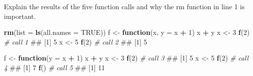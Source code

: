 \documentclass[12,]{article}
\newenvironment{Shaded}{\begin{snugshade}}{\end{snugshade}}
\newcommand{\KeywordTok}[1]{\textcolor[rgb]{0.13,0.29,0.53}{\textbf{#1}}}
\newcommand{\DataTypeTok}[1]{\textcolor[rgb]{0.13,0.29,0.53}{#1}}
\newcommand{\DecValTok}[1]{\textcolor[rgb]{0.00,0.00,0.81}{#1}}
\newcommand{\StringTok}[1]{\textcolor[rgb]{0.31,0.60,0.02}{#1}}
\newcommand{\CommentTok}[1]{\textcolor[rgb]{0.56,0.35,0.01}{\textit{#1}}}
\newcommand{\OtherTok}[1]{\textcolor[rgb]{0.56,0.35,0.01}{#1}}
\newcommand{\ControlFlowTok}[1]{\textcolor[rgb]{0.13,0.29,0.53}{\textbf{#1}}}
\newcommand{\OperatorTok}[1]{\textcolor[rgb]{0.81,0.36,0.00}{\textbf{#1}}}
\newcommand{\NormalTok}[1]{#1}
\begin{document}
Explain the results of the five function calls and why the rm function
in line 1 is important.

\begin{Shaded}
\begin{Highlighting}[]
\KeywordTok{rm}\NormalTok{(}\DataTypeTok{list =} \KeywordTok{ls}\NormalTok{(}\DataTypeTok{all.names =} \OtherTok{TRUE}\NormalTok{))}
\NormalTok{f <-}\StringTok{ }\ControlFlowTok{function}\NormalTok{(x, }\DataTypeTok{y =}\NormalTok{ x }\OperatorTok{+}\StringTok{ }\DecValTok{1}\NormalTok{) x }\OperatorTok{+}\StringTok{ }\NormalTok{y }
\NormalTok{x <-}\StringTok{ }\DecValTok{3}
\KeywordTok{f}\NormalTok{(}\DecValTok{2}\NormalTok{) }\CommentTok{# call 1}
\NormalTok{## [1] 5}
\NormalTok{x <-}\StringTok{ }\DecValTok{5}
\KeywordTok{f}\NormalTok{(}\DecValTok{2}\NormalTok{) }\CommentTok{# call 2}
\NormalTok{## [1] 5}

\NormalTok{f <-}\StringTok{ }\ControlFlowTok{function}\NormalTok{(}\DataTypeTok{y =}\NormalTok{ x }\OperatorTok{+}\StringTok{ }\DecValTok{1}\NormalTok{) x }\OperatorTok{+}\StringTok{ }\NormalTok{y }
\NormalTok{x <-}\StringTok{ }\DecValTok{3}
\KeywordTok{f}\NormalTok{(}\DecValTok{2}\NormalTok{) }\CommentTok{# call 3}
\NormalTok{## [1] 5}
\NormalTok{x <-}\StringTok{ }\DecValTok{5}
\KeywordTok{f}\NormalTok{(}\DecValTok{2}\NormalTok{) }\CommentTok{# call 4}
\NormalTok{## [1] 7}
\KeywordTok{f}\NormalTok{()  }\CommentTok{# call 5}
\NormalTok{## [1] 11}
\end{Highlighting}
\end{Shaded}
\end{document}

